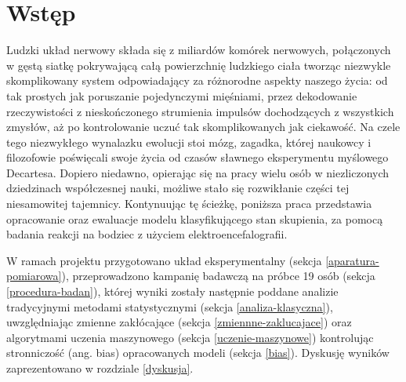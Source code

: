 \documentclass{./assets/wfis}
\begin{document}

\stronatytulowa

\begin{abstract}

\end{abstract}

\chapter{Wstęp}
Ludzki układ nerwowy składa się z miliardów komórek nerwowych, połączonych w gęstą siatkę pokrywającą całą powierzchnię ludzkiego ciała tworząc niezwykle skomplikowany system odpowiadający za różnorodne aspekty naszego życia: od tak prostych jak poruszanie pojedynczymi mięśniami, przez dekodowanie rzeczywistości z nieskończonego strumienia impulsów dochodzących z wszystkich zmysłów, aż po kontrolowanie uczuć tak skomplikowanych jak ciekawość. Na czele tego niezwykłego wynalazku ewolucji stoi mózg, zagadka, której naukowcy i filozofowie poświęcali swoje życia od czasów sławnego eksperymentu myślowego Decartesa. Dopiero niedawno, opierając się na pracy wielu osób w niezliczonych dziedzinach współczesnej nauki, możliwe stało się rozwikłanie części tej niesamowitej tajemnicy. Kontynuując tę ścieżkę, poniższa praca przedstawia opracowanie oraz ewaluacje modelu klasyfikującego stan skupienia, za pomocą badania reakcji na bodziec z użyciem elektroencefalografii. 

W ramach projektu przygotowano układ eksperymentalny (sekcja \ref{aparatura-pomiarowa}), przeprowadzono kampanię badawczą na próbce 19 osób (sekcja \ref{procedura-badan}), której wyniki zostały następnie poddane analizie tradycyjnymi metodami statystycznymi (sekcja \ref{analiza-klasyczna}), uwzględniając zmienne zakłócające (sekcja \ref{zmiennne-zaklucajace}) oraz algorytmami uczenia maszynowego (sekcja \ref{uczenie-maszynowe}) kontrolując stronniczość (ang. bias) opracowanych modeli (sekcja \ref{bias}). Dyskusję wyników zaprezentowano w rozdziale \ref{dyskusja}.
\end{document}
